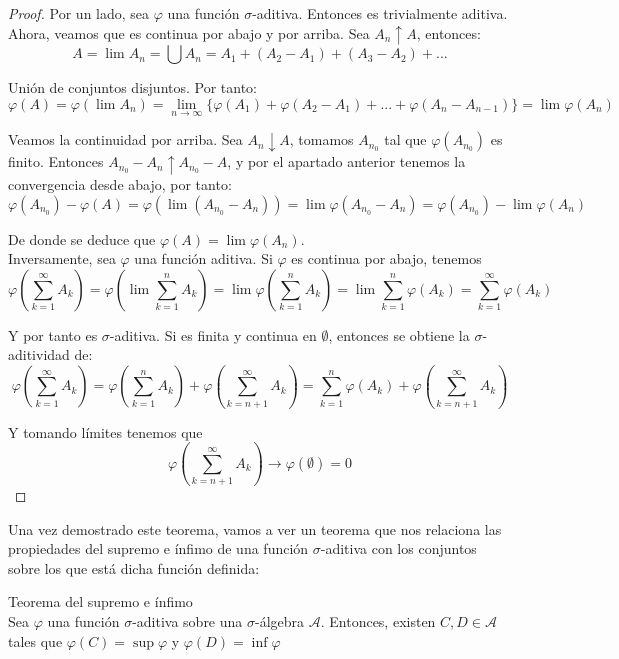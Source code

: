 \begin{proof}
Por un lado, sea $\varphi$ una función $\sigma$-aditiva. Entonces es trivialmente aditiva. Ahora, veamos que es continua por abajo y por arriba. Sea $A_n \uparrow A$, entonces:
$$ A = \lim A_n = \bigcup A_n = A_1 + (A_2 - A_1) + (A_3 - A_2) +... $$

Unión de conjuntos disjuntos. Por tanto:
$$ \varphi (A) = \varphi (\lim A_n) = \lim_{n \to \infty } \{ \varphi (A_1) + \varphi (A_2 - A_1) + ... + \varphi (A_n - A_{n-1}) \} = \lim \varphi (A_n) $$

Veamos la continuidad por arriba. Sea $A_n \downarrow A$, tomamos $A_{n_0}$ tal que $\varphi (A_{n_0})$ es finito. Entonces $A_{n_0} - A_n \uparrow A_{n_0} - A$, y por el apartado anterior tenemos la convergencia desde abajo, por tanto:
$$ \varphi (A_{n_0}) - \varphi (A) = \varphi (\lim (A_{n_0} - A_n)) = \lim \varphi (A_{n_0} - A_n) = \varphi (A_{n_0}) - \lim \varphi (A_n) $$

De donde se deduce que $ \varphi (A) = \lim \varphi (A_n) $.\\

Inversamente, sea $ \varphi$ una función aditiva. Si $\varphi$ es continua por abajo, tenemos
$$ \varphi \left( \sum_{k=1}^{\infty} A_k \right) = \varphi \left( \lim \sum_{k=1}^n A_k \right) = \lim \varphi \left( \sum_{k=1}^n A_k \right) = \lim \sum_{k=1}^n \varphi \left( A_k \right) = \sum_{k=1}^{\infty} \varphi (A_k) $$

Y por tanto es $\sigma$-aditiva. Si es finita y continua en $\emptyset$, entonces se obtiene la $\sigma$-aditividad de:
$$ \varphi \left( \sum_{k=1}^{\infty} A_k \right) = \varphi \left( \sum_{k=1}^{n} A_k \right) + \varphi \left( \sum_{k=n+1}^{\infty} A_k \right) = \sum_{k=1}^{n} \varphi (A_k) + \varphi \left( \sum_{k=n+1}^{\infty} A_k \right) $$

Y tomando límites tenemos que
$$ \varphi \left( \sum_{k=n+1}^{\infty} A_k \right) \to \varphi (\emptyset) = 0 $$

\end{proof}

Una vez demostrado este teorema, vamos a ver un teorema que nos relaciona las propiedades del supremo e ínfimo de una función $\sigma$-aditiva con los conjuntos sobre los que está dicha función definida:

\begin{theorem}
Teorema del supremo e ínfimo\\

Sea $\varphi$ una función $\sigma$-aditiva sobre una $\sigma$-álgebra $\mathcal{A}$. Entonces, existen $C,D \in \mathcal{A}$ tales que $\varphi (C) = \sup \varphi$ y $\varphi (D) = \inf \varphi$
\end{theorem}

